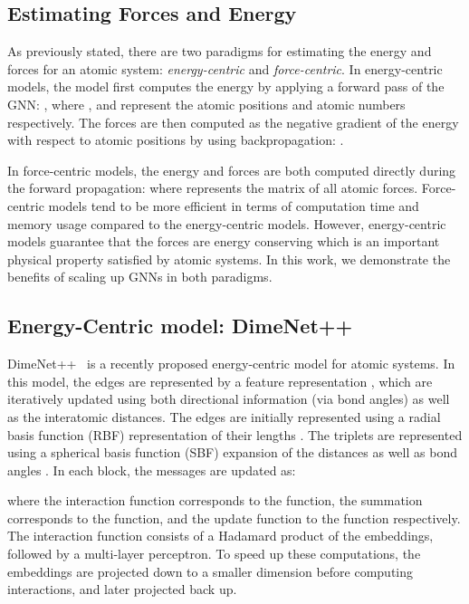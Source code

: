 \documentclass{article} \usepackage{iclr2022_conference,times}
\begin{document}
\subsection{Estimating Forces and Energy}

As previously stated, there are two paradigms for estimating the energy and forces for an atomic system: \emph{energy-centric} and \emph{force-centric}. In energy-centric models, the model first computes the energy  by applying a forward pass of the GNN: , where , and  represent the atomic positions and atomic numbers respectively. The forces are then computed as the negative gradient of the energy with respect to atomic positions by using backpropagation: .

In force-centric models, the energy and forces are both computed directly during the forward propagation:  where  represents the matrix of all atomic forces. Force-centric models tend to be more efficient in terms of computation time and memory usage compared to the energy-centric models. However, energy-centric models guarantee that the forces are energy conserving which is an important physical property satisfied by atomic systems. In this work, we demonstrate the benefits of scaling up GNNs in both paradigms.

\subsection{Energy-Centric model: DimeNet++}

DimeNet++~\citep{klicpera_dimenetpp_2020} is a recently proposed energy-centric model for atomic systems. In this model, the edges are represented by a feature representation , which are iteratively updated using both directional information (via bond angles) as well as the interatomic distances. The edges are initially represented using a radial basis function (RBF) representation  of their lengths . The triplets are represented using a spherical basis function (SBF) expansion  of the distances  as well as bond angles . In each block, the messages are updated as:

where the interaction function  corresponds to the  function, the summation corresponds to the  function, and the update function  to the  function respectively. The interaction function consists of a Hadamard product of the embeddings, followed by a multi-layer perceptron. To speed up these computations, the embeddings are projected down to a smaller dimension before computing interactions, and later projected back up.
\end{document}
